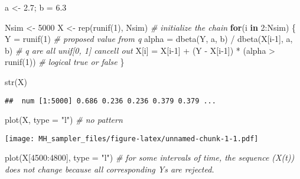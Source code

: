 \documentclass[
]{article}
\newenvironment{Shaded}{\begin{snugshade}}{\end{snugshade}}
\newcommand{\AttributeTok}[1]{\textcolor[rgb]{0.77,0.63,0.00}{#1}}
\newcommand{\CommentTok}[1]{\textcolor[rgb]{0.56,0.35,0.01}{\textit{#1}}}
\newcommand{\ControlFlowTok}[1]{\textcolor[rgb]{0.13,0.29,0.53}{\textbf{#1}}}
\newcommand{\DecValTok}[1]{\textcolor[rgb]{0.00,0.00,0.81}{#1}}
\newcommand{\FloatTok}[1]{\textcolor[rgb]{0.00,0.00,0.81}{#1}}
\newcommand{\FunctionTok}[1]{\textcolor[rgb]{0.00,0.00,0.00}{#1}}
\newcommand{\NormalTok}[1]{#1}
\newcommand{\OtherTok}[1]{\textcolor[rgb]{0.56,0.35,0.01}{#1}}
\newcommand{\SpecialCharTok}[1]{\textcolor[rgb]{0.00,0.00,0.00}{#1}}
\newcommand{\StringTok}[1]{\textcolor[rgb]{0.31,0.60,0.02}{#1}}
\begin{document}
\begin{Shaded}
\begin{Highlighting}[]
\NormalTok{a }\OtherTok{\textless{}{-}} \FloatTok{2.7}\NormalTok{; b }\OtherTok{=} \FloatTok{6.3}

\NormalTok{Nsim }\OtherTok{\textless{}{-}} \DecValTok{5000}
\NormalTok{X }\OtherTok{\textless{}{-}} \FunctionTok{rep}\NormalTok{(}\FunctionTok{runif}\NormalTok{(}\DecValTok{1}\NormalTok{), Nsim)   }\CommentTok{\# initialize the chain}
\ControlFlowTok{for}\NormalTok{(i }\ControlFlowTok{in} \DecValTok{2}\SpecialCharTok{:}\NormalTok{Nsim) \{}
\NormalTok{  Y }\OtherTok{=} \FunctionTok{runif}\NormalTok{(}\DecValTok{1}\NormalTok{)        }\CommentTok{\# proposed value from q}
\NormalTok{  alpha }\OtherTok{=} \FunctionTok{dbeta}\NormalTok{(Y, a, b) }\SpecialCharTok{/} \FunctionTok{dbeta}\NormalTok{(X[i}\DecValTok{{-}1}\NormalTok{], a, b)    }\CommentTok{\# q are all unif[0, 1] cancell out}
\NormalTok{  X[i] }\OtherTok{=}\NormalTok{ X[i}\DecValTok{{-}1}\NormalTok{] }\SpecialCharTok{+}\NormalTok{ (Y }\SpecialCharTok{{-}}\NormalTok{ X[i}\DecValTok{{-}1}\NormalTok{]) }\SpecialCharTok{*}\NormalTok{ (alpha }\SpecialCharTok{\textgreater{}} \FunctionTok{runif}\NormalTok{(}\DecValTok{1}\NormalTok{))   }\CommentTok{\# logical true or false}
\NormalTok{\}}

\FunctionTok{str}\NormalTok{(X)}
\end{Highlighting}
\end{Shaded}

\begin{verbatim}
##  num [1:5000] 0.686 0.236 0.236 0.379 0.379 ...
\end{verbatim}

\begin{Shaded}
\begin{Highlighting}[]
\FunctionTok{plot}\NormalTok{(X, }\AttributeTok{type =} \StringTok{"l"}\NormalTok{)    }\CommentTok{\# no pattern }
\end{Highlighting}
\end{Shaded}

\texttt{[image: MH\_sampler\_files/figure-latex/unnamed-chunk-1-1.pdf]}

\begin{Shaded}
\begin{Highlighting}[]
\FunctionTok{plot}\NormalTok{(X[}\DecValTok{4500}\SpecialCharTok{:}\DecValTok{4800}\NormalTok{], }\AttributeTok{type =} \StringTok{"l"}\NormalTok{)      }\CommentTok{\# for some intervals of time, the sequence (X(t)) does not change because all corresponding Y\textquotesingle{}s are rejected. }
\end{Highlighting}
\end{Shaded}
\end{document}

